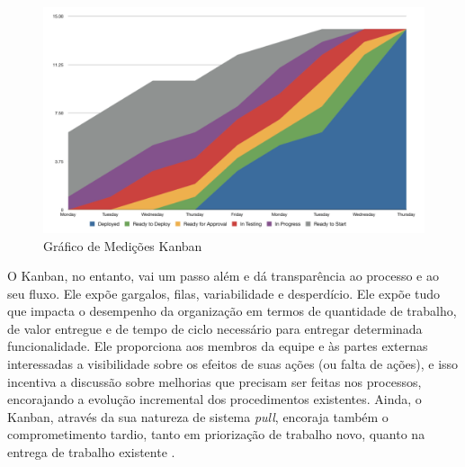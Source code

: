 \begin{figure}[H]
		\centering
		\label{fig05}
			\includegraphics[scale=0.4]{figuras/metricasKanban.png}
		\caption{Gráfico de Medições Kanban  \cite{klipp}}
\end{figure}

O Kanban, no entanto, vai um passo além e dá transparência ao processo e ao seu fluxo. Ele expõe gargalos, filas, variabilidade e desperdício. Ele expõe tudo que impacta o desempenho da organização em termos de quantidade de trabalho, de valor entregue e de tempo de ciclo necessário para entregar determinada funcionalidade. Ele proporciona aos membros da equipe e às partes  externas interessadas a visibilidade sobre os efeitos de suas ações (ou falta de ações), e isso incentiva a discussão sobre melhorias que precisam ser feitas nos processos, encorajando a evolução incremental dos procedimentos existentes. Ainda, o Kanban, através da sua natureza de sistema \textit{pull}, encoraja também o comprometimento tardio, tanto em priorização de trabalho novo, quanto na entrega de trabalho existente \cite{kniberg2009}. 
